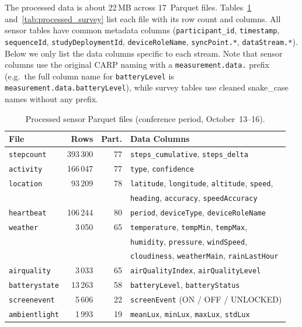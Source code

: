 \documentclass[11pt,a4paper]{article}
\begin{document}
The processed data is about 22\,MB across 17~Parquet files.
Tables~\ref{tab:processed_sensor} and~\ref{tab:processed_survey} list each file with its row count and columns.
All sensor tables have common metadata columns (\texttt{participant\_id}, \texttt{timestamp}, \texttt{sequenceId}, \texttt{studyDeploymentId}, \texttt{deviceRoleName}, \texttt{syncPoint.*}, \texttt{dataStream.*}). Below we only list the data columns specific to each stream. Note that sensor columns use the original CARP naming with a \texttt{measurement.data.} prefix (e.g.\ the full column name for \texttt{batteryLevel} is \texttt{measurement.data.batteryLevel}), while survey tables use cleaned snake\_case names without any prefix.

\begin{table}[H]
\centering
\caption{Processed sensor Parquet files (conference period, October~13--16).}
\label{tab:processed_sensor}
\small
\begin{tabular}{lrrl}
\toprule
\textbf{File} & \textbf{Rows} & \textbf{Part.} & \textbf{Data Columns} \\
\midrule
\texttt{stepcount}
    & 393\,300 & 77
    & \texttt{steps\_cumulative}, \texttt{steps\_delta} \\
\texttt{activity}
    & 166\,047 & 77
    & \texttt{type}, \texttt{confidence} \\
\texttt{location}
    &  93\,209 & 78
    & \texttt{latitude}, \texttt{longitude}, \texttt{altitude}, \texttt{speed}, \\
    & & & \texttt{heading}, \texttt{accuracy}, \texttt{speedAccuracy} \\
\texttt{heartbeat}
    & 106\,244 & 80
    & \texttt{period}, \texttt{deviceType}, \texttt{deviceRoleName} \\
\texttt{weather}
    &   3\,050 & 65
    & \texttt{temperature}, \texttt{tempMin}, \texttt{tempMax}, \\
    & & & \texttt{humidity}, \texttt{pressure}, \texttt{windSpeed}, \\
    & & & \texttt{cloudiness}, \texttt{weatherMain}, \texttt{rainLastHour} \\
\texttt{airquality}
    &   3\,033 & 65
    & \texttt{airQualityIndex}, \texttt{airQualityLevel} \\
\texttt{batterystate}
    &  13\,263 & 58
    & \texttt{batteryLevel}, \texttt{batteryStatus} \\
\texttt{screenevent}
    &   5\,606 & 22
    & \texttt{screenEvent} (ON / OFF / UNLOCKED) \\
\texttt{ambientlight}
    &   1\,993 & 19
    & \texttt{meanLux}, \texttt{minLux}, \texttt{maxLux}, \texttt{stdLux} \\
\bottomrule
\end{tabular}
\end{table}
\end{document}

